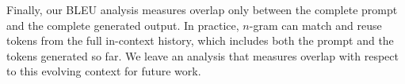 Finally, our BLEU analysis measures overlap only between the complete prompt and the complete generated output. In practice, $n$-gram can match and reuse tokens from the full in-context history, which includes both the prompt and the tokens generated so far. We leave an analysis that measures overlap with respect to this evolving context for future work.




